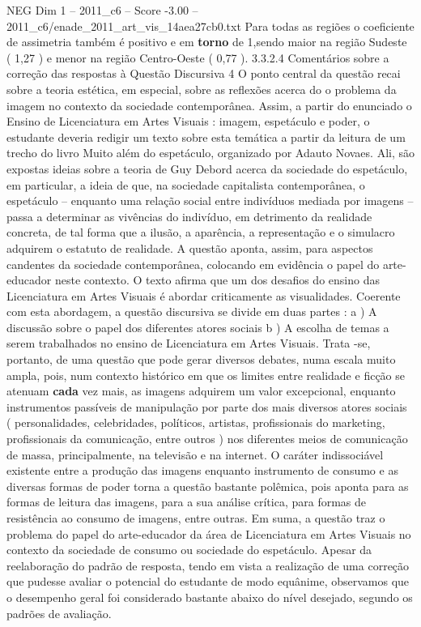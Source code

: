 \begin{textsample}{NEG Dim 1 – 2011\_c6 – Score -3.00 – 2011\_c6/enade\_2011\_art\_vis\_14aea27cb0.txt}
Para todas as regiões o coeficiente de assimetria também é positivo e em \textbf{torno} de 1,sendo maior na região Sudeste ( 1,27 ) e menor na região Centro-Oeste ( 0,77 ). 3.3.2.4 Comentários sobre a correção das respostas à Questão Discursiva 4 O ponto central da questão recai sobre a teoria estética, em especial, sobre as reflexões acerca do o problema da imagem no contexto da sociedade contemporânea.
Assim, a partir do enunciado o Ensino de Licenciatura em Artes Visuais : imagem, espetáculo e poder, o estudante deveria redigir um texto sobre esta temática a partir da leitura de um trecho do livro Muito além do espetáculo, organizado por Adauto Novaes.
Ali, são expostas ideias sobre a teoria de Guy Debord acerca da sociedade do espetáculo, em particular, a ideia de que, na sociedade capitalista contemporânea, o espetáculo – enquanto uma relação social entre indivíduos mediada por imagens – passa a determinar as vivências do indivíduo, em detrimento da realidade concreta, de tal forma que a ilusão, a aparência, a representação e o simulacro adquirem o estatuto de realidade.
A questão aponta, assim, para aspectos candentes da sociedade contemporânea, colocando em evidência o papel do arte-educador neste contexto.
O texto afirma que um dos desafios do ensino das Licenciatura em Artes Visuais é abordar criticamente as visualidades.
Coerente com esta abordagem, a questão discursiva se divide em duas partes : a ) A discussão sobre o papel dos diferentes atores sociais b ) A escolha de temas a serem trabalhados no ensino de Licenciatura em Artes Visuais.
Trata -se, portanto, de uma questão que pode gerar diversos debates, numa escala muito ampla, pois, num contexto histórico em que os limites entre realidade e ficção se atenuam \textbf{cada} vez mais, as imagens adquirem um valor excepcional, enquanto instrumentos passíveis de manipulação por parte dos mais diversos atores sociais ( personalidades, celebridades, políticos, artistas, profissionais do marketing, profissionais da comunicação, entre outros ) nos diferentes meios de comunicação de massa, principalmente, na televisão e na internet.
O caráter indissociável existente entre a produção das imagens enquanto instrumento de consumo e as diversas formas de poder torna a questão bastante polêmica, pois aponta para as formas de leitura das imagens, para a sua análise crítica, para formas de resistência ao consumo de imagens, entre outras.
Em suma, a questão traz o problema do papel do arte-educador da área de Licenciatura em Artes Visuais no contexto da sociedade de consumo ou sociedade do espetáculo.
Apesar da reelaboração do padrão de resposta, tendo em vista a realização de uma correção que pudesse avaliar o potencial do estudante de modo equânime, observamos que o desempenho geral foi considerado bastante abaixo do nível desejado, segundo os padrões de avaliação.

\end{textsample}
